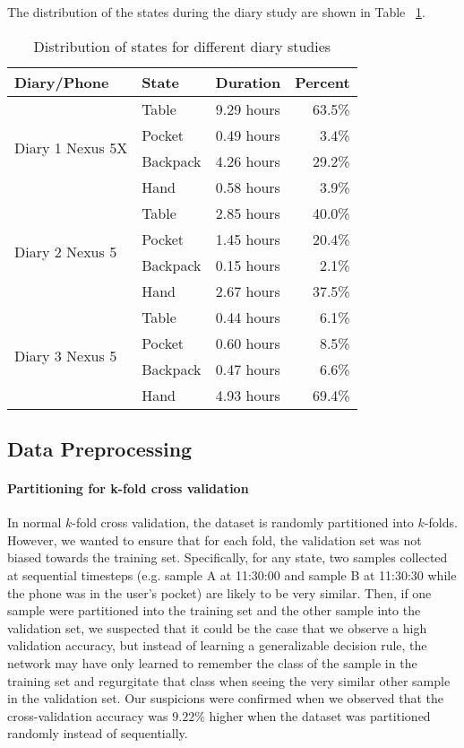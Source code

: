 The distribution of the states during the diary study are shown in Table ~\ref{tab:diarydistr}.


\begin{table}[h]
\caption{Distribution of states for different diary studies} \label{tab:diarydistr} 
\centering

\begin{tabular}{llcr } 
 Diary/Phone & State & Duration & Percent\\
 \toprule
 \multirow{4}{1.4cm}{ Diary 1 Nexus 5X} &
 Table & 9.29 hours & 63.5\%  \\ 
 & Pocket & 0.49 hours & 3.4\% \\ 
 & Backpack &  4.26 hours  &  29.2\% \\ 
 & Hand & 0.58 hours  & 3.9\% \\
 \midrule
 \multirow{4}{1.4cm}{\centering Diary 2 Nexus 5} &
 Table & 2.85 hours & 40.0\%  \\ 
 & Pocket & 1.45 hours & 20.4\% \\ 
 & Backpack &  0.15 hours  &  2.1\% \\ 
 & Hand & 2.67 hours  & 37.5\% \\
  \midrule
 \multirow{4}{1.4cm}{\centering Diary 3 Nexus 5} &
 Table & 0.44 hours & 6.1\%  \\ 
 & Pocket & 0.60 hours & 8.5\% \\ 
 & Backpack &  0.47 hours &  6.6\% \\ 
 & Hand & 4.93 hours  & 69.4\% \\
\bottomrule
\end{tabular}
\end{table}

\subsection{Data Preprocessing}
\paragraph{Partitioning for k-fold cross validation}
In normal $k$-fold cross validation, the dataset is randomly partitioned into
$k$-folds. However, we wanted to ensure that for each fold, the validation set
was not biased towards the training set. Specifically, for any state, two samples collected at sequential timesteps
(e.g. sample A at 11:30:00 and sample B at 11:30:30 while the phone was in 
the user's pocket) are likely to be very similar. Then, if one sample 
were partitioned into the training set and the other sample into the validation set, we suspected
that it could be the case that we observe a high validation accuracy, but instead of learning 
a generalizable decision rule, the network may have only learned to remember the class of the sample in the training set 
and regurgitate that class when seeing the very similar other sample in the validation set. 
Our suspicions were confirmed when we observed that the cross-validation accuracy
was $9.22\%$ higher when the dataset was partitioned randomly instead of sequentially.

